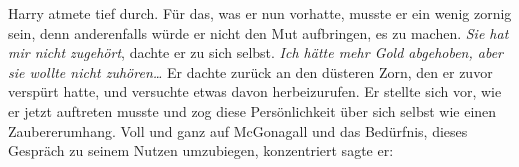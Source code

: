 Harry atmete tief durch. Für das, was er nun vorhatte, musste er ein wenig zornig sein, denn anderenfalls würde er nicht den Mut aufbringen, es zu machen. \emph{Sie hat mir nicht zugehört}, dachte er zu sich selbst. \emph{Ich hätte mehr Gold abgehoben, aber sie wollte nicht zuhören…} Er dachte zurück an den düsteren Zorn, den er zuvor verspürt hatte, und versuchte etwas davon herbeizurufen. Er stellte sich vor, wie er jetzt auftreten musste und zog diese Persönlichkeit über sich selbst wie einen Zaubererumhang. Voll und ganz auf McGonagall und das Bedürfnis, dieses Gespräch zu seinem Nutzen umzubiegen, konzentriert sagte er:

